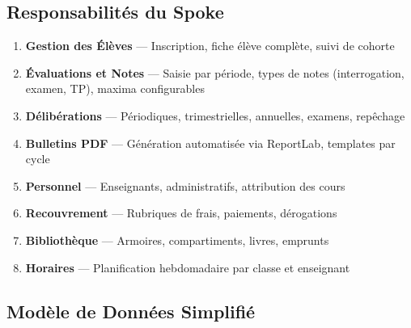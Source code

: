 \documentclass[12pt,a4paper,oneside]{report}
\begin{document}
\subsection{Responsabilités du Spoke}

\begin{enumerate}
  \item \textbf{Gestion des Élèves} — Inscription, fiche élève complète, suivi de cohorte
  \item \textbf{Évaluations et Notes} — Saisie par période, types de notes (interrogation, examen, TP), maxima configurables
  \item \textbf{Délibérations} — Périodiques, trimestrielles, annuelles, examens, repêchage
  \item \textbf{Bulletins PDF} — Génération automatisée via ReportLab, templates par cycle
  \item \textbf{Personnel} — Enseignants, administratifs, attribution des cours
  \item \textbf{Recouvrement} — Rubriques de frais, paiements, dérogations
  \item \textbf{Bibliothèque} — Armoires, compartiments, livres, emprunts
  \item \textbf{Horaires} — Planification hebdomadaire par classe et enseignant
\end{enumerate}

\subsection{Modèle de Données Simplifié}
\end{document}
